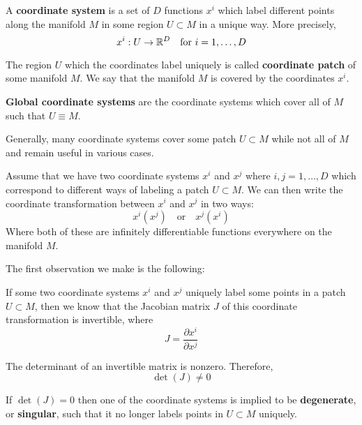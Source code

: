 \documentclass{article}
\begin{document}
 		\begin{defn}
 			A \textbf{coordinate system} is a set of $D$ functions $x^i$ which label different points along the manifold $M$ in some region $U \subset M$ in a unique way. More precisely,
 			$$ x^i : U \to \mathbb{R}^D \quad \text{for }i=1,\dots,D $$
 		\end{defn}
 		\begin{defn}
 			The region $U$ which the coordinates label uniquely is called \textbf{coordinate patch} of some manifold $M$. We say that the manifold $M$ is covered by the coordinates $x^i$.
 		\end{defn} 
 		\begin{defn}
 			\textbf{Global coordinate systems} are the coordinate systems which cover all of $M$ such that $U \equiv M$. 
 		\end{defn}
 		Generally, many coordinate systems cover some patch $U \subset M$ while not all of $M$ and remain useful in various cases.
 		\begin{exmp}
 			Assume that we have two coordinate systems $x^i$ and $x^j$ where $i,j = 1,\dots, D$ which correspond to different ways of labeling a patch $U \subset M$. We can then write the coordinate transformation between $x^i$ and $x^j$ in two ways:
 			$$ x^i (x^j) \quad \text{or} \quad x^j (x^i)$$
 			Where both of these are infinitely differentiable functions everywhere on the manifold $M$.
 		\end{exmp}
 		The first observation we make is the following: 
 		\begin{thm}
 			If some two coordinate systems $x^i$ and $x^j$ uniquely label some points in a patch $U \subset M$, then we know that the Jacobian matrix $J$ of this coordinate transformation is invertible, where
 			$$ J = \frac{\partial x^i}{\partial x^j}$$
 		\end{thm}
 		\begin{cor}
 			The determinant of an invertible matrix is nonzero. Therefore,
 			$$ \det (J) \neq 0$$
 		\end{cor}
 		\begin{cor}
 			If $\det(J)=0$ then one of the coordinate systems is implied to be \textbf{degenerate}, or \textbf{singular}, such that it no longer labels points in $U \subset M$ uniquely. 
 		\end{cor}
\end{document}
